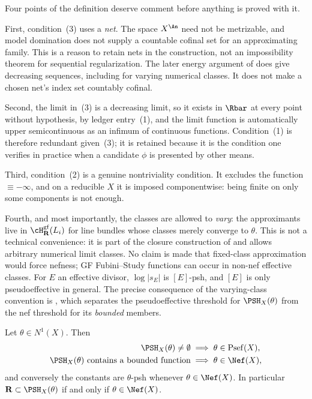 Four points of the definition deserve comment before anything is proved
with it.

First, condition~(3) uses a \emph{net}.
The space $X^{\An}$ need not be metrizable, and model domination
does not supply a countable cofinal set for an approximating family.
This is a reason to retain nets in the construction, not an
impossibility theorem for sequential regularization.
The later energy argument of \cite[Corollary~12.18]{BJ22} does give
decreasing sequences, including for varying numerical classes.
It does not make a chosen net's index set countably cofinal.

Second, the limit in~(3) is a decreasing limit, so it exists in
$\Rbar$ at every point without hypothesis, by ledger entry~(1), and the
limit function is automatically upper semicontinuous as an infimum of
continuous functions.  Condition~(1) is therefore redundant given~(3); it is
retained because it is the condition one verifies in practice when a
candidate $\phi$ is presented by other means.

Third, condition~(2) is a genuine nontriviality condition.  It excludes the
function $\equiv-\infty$, and on a reducible $X$ it is imposed
componentwise: being finite on only some components is not enough.

Fourth, and most importantly, the classes are allowed to \emph{vary}: the
approximants live in $\cH^{\mathrm{gf}}_{\mathbf R}(L_i)$ for line bundles
whose classes merely converge to $\theta$.  This is not a technical
convenience: it is part of the closure construction of
\cite[Definition~4.1]{BJ22} and allows arbitrary numerical limit classes.
No claim is made that fixed-class approximation would force nefness; GF
Fubini--Study functions can occur in non-nef effective classes.  For $E$
an effective divisor, $\log|s_E|$ is $[E]$-psh, and $[E]$ is only
pseudoeffective in general.  The precise
consequence of the varying-class convention is
, which separates the pseudoeffective threshold
for $\PSH_X(\theta)$ from the nef threshold for its \emph{bounded}
members.

\begin{lemma}
\label{lem:ch34-psh-nonempty}
Let $\theta\in N^1(X)$.  Then
\begin{equation}
\label{eq:psh-existence-cones}
 \begin{aligned}
 \PSH_X(\theta)\ne\emptyset
 &\implies \theta\in\operatorname{Psef}(X),\\
 \PSH_X(\theta)\ \text{contains a bounded function}
 &\implies \theta\in\Nef(X),
 \end{aligned}
\end{equation}
and conversely the constants are $\theta$-psh whenever
$\theta\in\Nef(X)$.  In particular
$\mathbf R\subset\PSH_X(\theta)$ if and only if $\theta\in\Nef(X)$.
\end{lemma}

